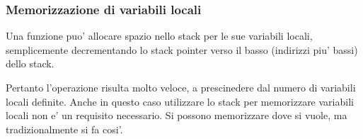 \subsubsection{Memorizzazione di variabili locali}

Una funzione puo' allocare spazio nello stack per le sue variabili locali, semplicemente decrementando
lo \gls{stack pointer} verso il basso (indirizzi piu' bassi) dello stack.


Pertanto l'operazione risulta molto veloce, a prescinedere dal numero di variabili locali definite.
Anche in questo caso utilizzare lo stack per memorizzare variabili locali non e' un requisito necessario.
Si possono memorizzare dove si vuole, ma tradizionalmente si fa cosi'.
